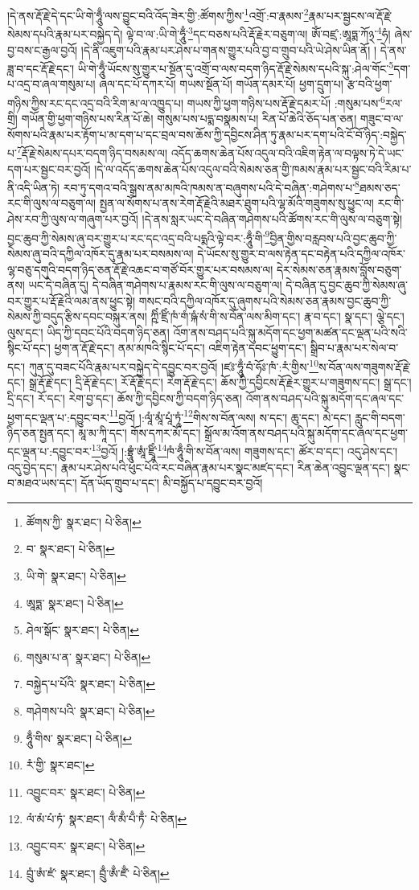 །དེ་ནས་རྡོ་རྗེ་དེ་དང་ཡི་གེ་ཧཱུྃ་ལས་བྱུང་བའི་འོད་ཟེར་གྱི་:ཚོགས་ཀྱིས་\footnote{ཚོགས་ཀྱི་  སྣར་ཐང་།  པེ་ཅིན། }འགྲོ་:བ་རྣམས་\footnote{བ་  སྣར་ཐང་།  པེ་ཅིན། }རྣམ་པར་སྦྱངས་ལ་རྡོ་རྗེ་སེམས་དཔའི་རྣམ་པར་བསྐྱེད་དེ། ལྟེ་བ་ལ་:ཡི་གེ་ཧཱུྃ་\footnote{ཡི་གེ་  སྣར་ཐང་།  པེ་ཅིན། }དང་བཅས་པའི་རྡོ་རྗེར་བཅུག་ལ། ཨོཾ་བཛྲ་:ཨཱཏྨ་ཀོ྅་\footnote{ཨཱཏྨ་  སྣར་ཐང་།  པེ་ཅིན། }ཧཾ། ཞེས་བྱ་བས་ང་རྒྱལ་བྱའོ། །དེ་ནི་འཇུག་པའི་རྣམ་པར་ཤེས་པ་གནས་གྱུར་པའི་བྱ་བ་གྲུབ་པའི་ཡེ་ཤེས་ཡིན་ནོ། །
དེ་ནས་ཟླ་བ་དང་རྡོ་རྗེ་དང་། ཡི་གེ་ཧཱུྃ་ཡོངས་སུ་གྱུར་པ་སྔོན་དུ་འགྲོ་བ་ལས་བདག་ཉིད་རྡོ་རྗེ་སེམས་དཔའི་སྐུ་:ཤེལ་གོང་\footnote{ཤེལ་སྒོང་  སྣར་ཐང་།  པེ་ཅིན། }དག་པ་འདྲ་བ་ཞལ་གསུམ་པ། ཞལ་དང་པོ་དཀར་པོ། གཡས་སྔོན་པོ། གཡོན་དམར་པོ། ཕྱག་དྲུག་པ། རྩ་བའི་ཕྱག་གཉིས་ཀྱིས་རང་དང་འདྲ་བའི་རིག་མ་ལ་འཁྱུད་པ། གཡས་ཀྱི་ཕྱག་གཉིས་པས་རྡོ་རྗེ་དམར་པོ། :གསུམ་པས་\footnote{གསུམ་པ་ན་  སྣར་ཐང་།  པེ་ཅིན། }རལ་གྲི། གཡོན་གྱི་ཕྱག་གཉིས་པས་རིན་པོ་ཆེ། གསུམ་པས་པདྨ་བསྣམས་པ། རིན་པོ་ཆེའི་ཅོད་པན་ཅན། གཟུང་བ་ལ་སོགས་པའི་རྣམ་པར་རྟོག་པ་མ་དག་པ་དང་བྲལ་བས་ཆོས་ཀྱི་དབྱིངས་ཤིན་ཏུ་རྣམ་པར་དག་པའི་ངོ་བོ་ཉིད་:བསྐྱེད་པ་\footnote{བསྐྱེད་པ་པོའི་  སྣར་ཐང་།  པེ་ཅིན། }རྡོ་རྗེ་སེམས་དཔར་བདག་ཉིད་བསམས་ལ། འདོད་ཆགས་ཆེན་པོས་འདུལ་བའི་འཇིག་རྟེན་ལ་བལྟས་ཏེ་དེ་ཡང་དག་པར་སྦྱང་བར་བྱའོ། །དེ་ལ་འདོད་ཆགས་ཆེན་པོས་འདུལ་བའི་སེམས་ཅན་གྱི་ཁམས་རྣམ་པར་སྦྱང་བའི་རིམ་པ་ནི་འདི་ཡིན་ཏེ། རབ་ཏུ་དགའ་བའི་སྒྲས་ནམ་མཁའི་ཁམས་ན་བཞུགས་པའི་དེ་བཞིན་:གཤེགས་པ་\footnote{གཤེགས་པའི་  སྣར་ཐང་།  པེ་ཅིན། }ཐམས་ཅད་རང་གི་ལུས་ལ་བཅུག་ལ། སྤྱན་ལ་སོགས་པ་ནས་རེག་རྡོ་རྗེའི་མཐར་ཐུག་པའི་ལྷ་མོའི་གཟུགས་སུ་ཕྱུང་ལ། རང་གི་ཤེས་རབ་ཀྱི་ལུས་ལ་གཞུག་པར་བྱའོ། །དེ་ནས་སླར་ཡང་དེ་བཞིན་གཤེགས་པའི་ཚོགས་རང་གི་ལུས་ལ་བཅུག་སྟེ། བྱང་ཆུབ་ཀྱི་སེམས་ཞུ་བར་གྱུར་པ་རང་དང་འདྲ་བའི་པདྨའི་ལྟེ་བར་:ཧཱུྃ་གི་\footnote{ཧཱུྃ་གིས་  སྣར་ཐང་།  པེ་ཅིན། }བྱིན་གྱིས་བརླབས་པའི་བྱང་ཆུབ་ཀྱི་སེམས་ཞུ་བའི་དཀྱིལ་འཁོར་དུ་རྣམ་པར་བསམས་ལ། དེ་ཡོངས་སུ་གྱུར་བ་ལས་རྟེན་དང་བརྟེན་པའི་དཀྱིལ་འཁོར་ལྷ་བཅུ་དགུའི་བདག་ཉིད་ཅན་རྡོ་རྗེ་འཆང་བ་གཙོ་བོར་གྱུར་པར་བསམས་ལ། དེར་སེམས་ཅན་རྣམས་བློས་བཅུག་ནས། ཡང་དེ་བཞིན་དུ། དེ་བཞིན་གཤེགས་པ་རྣམས་རང་གི་ལུས་ལ་བཅུག་ལ། དེ་བཞིན་དུ་བྱང་ཆུབ་ཀྱི་སེམས་ཞུ་བར་གྱུར་པ་རྡོ་རྗེའི་ལམ་ནས་ཕྱུང་སྟེ། གསང་བའི་དཀྱིལ་འཁོར་དུ་ཞུགས་པའི་སེམས་ཅན་རྣམས་བྱང་ཆུབ་ཀྱི་སེམས་ཀྱི་བདུད་རྩིས་དབང་བསྐུར་ནས། ཀྵིཾ་ཛྲིཾ་ཁཾ་གཾ་ཥྐཾ་སཾ་གི་ས་བོན་ལས་མིག་དང་། རྣ་བ་དང་། སྣ་དང་། ལྕེ་དང་། ལུས་དང་། ཡིད་ཀྱི་དབང་པོའི་བདག་ཉིད་ཅན། འོག་ནས་བཤད་པའི་སྐུ་མདོག་དང་ཕྱག་མཚན་དང་ལྡན་པའི་སའི་སྙིང་པོ་དང་། ཕྱག་ན་རྡོ་རྗེ་དང་། ནམ་མཁའི་སྙིང་པོ་དང་། འཇིག་རྟེན་དབང་ཕྱུག་དང་། སྒྲིབ་པ་རྣམ་པར་སེལ་བ་དང་། ཀུན་དུ་བཟང་པོའི་རྣམ་པར་བསྐྱེད་དེ་དབྱུང་བར་བྱའོ། །ཛཿ་ཧཱུྃ་བཾ་ཧོཿ་ཁཾ་:རཾ་གྱིས་\footnote{རཾ་གྱི་  སྣར་ཐང་། }ས་བོན་ལས་གཟུགས་རྡོ་རྗེ་དང་། སྒྲ་རྡོ་རྗེ་དང་། དྲི་རྡོ་རྗེ་དང་། རོ་རྡོ་རྗེ་དང་། རེག་རྡོ་རྗེ་དང་། ཆོས་ཀྱི་དབྱིངས་རྡོ་རྗེར་གྱུར་པ་གཟུགས་དང་། སྒྲ་དང་། དྲི་དང་། རོ་དང་། རེག་བྱ་དང་། ཆོས་ཀྱི་དབྱིངས་ཀྱི་བདག་ཉིད་ཅན། འོག་ནས་བཤད་པའི་སྐུ་མདོག་དང་ཞལ་དང་ཕྱག་དང་ལྡན་པ་:དབྱུང་བར་\footnote{འབྱུང་བར་  སྣར་ཐང་།  པེ་ཅིན། }བྱའོ། །:ལཱཾ་མཱཾ་པཱཾ་ཏཱཾ་\footnote{ལཾ་མཾ་པཾ་ཏཾ་  སྣར་ཐང་། ལྃ་མྃ་པྃ་ཏྃ་  པེ་ཅིན། }གིས་ས་བོན་ལས། ས་དང་། ཆུ་དང་། མེ་དང་། རླུང་གི་བདག་ཉིད་ཅན་སྤྱན་དང་། མཱ་མ་ཀཱི་དང་། གོས་དཀར་མོ་དང་། སྒྲོལ་མ་འོག་ནས་བཤད་པའི་སྐུ་མདོག་དང་ཞལ་དང་ཕྱག་དང་ལྡན་པ་:དབྱུང་བར་\footnote{འབྱུང་བར་  སྣར་ཐང་།  པེ་ཅིན། }བྱའོ། །:བྷྲཱུཾ་ཨཱཾ་ཛྲཱིཾ་\footnote{བྲུཾ་ཨཾ་ཛཾ་  སྣར་ཐང་། བྲུྃ་ཨྃ་ཛྃ་  པེ་ཅིན། }ཁཾ་ཧཱུྃ་གི་ས་བོན་ལས། གཟུགས་དང་། ཚོར་བ་དང་། འདུ་ཤེས་དང་། འདུ་བྱེད་དང་། རྣམ་པར་ཤེས་པའི་ཕུང་པོའི་རང་བཞིན་རྣམ་པར་སྣང་མཛད་དང་། རིན་ཆེན་འབྱུང་ལྡན་དང་། སྣང་བ་མཐའ་ཡས་དང་། དོན་ཡོད་གྲུབ་པ་དང་། མི་བསྐྱོད་པ་དབྱུང་བར་བྱའོ། 